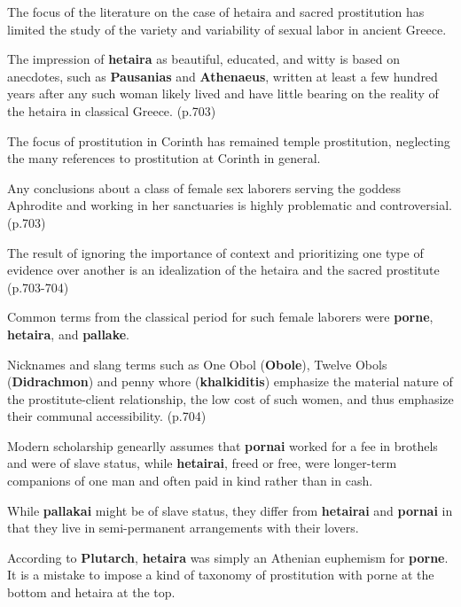 The focus of the literature on the case of hetaira and sacred prostitution has limited the study of the variety and variability of sexual labor in ancient Greece. 

\begin{rmk}
    The impression of \textbf{hetaira} as beautiful, educated, and witty is based on anecdotes, such as \textbf{Pausanias} and \textbf{Athenaeus}, written at least a few hundred years after any such woman likely lived and have little bearing on the reality of the hetaira in classical Greece. (p.703)
\end{rmk}

The focus of prostitution in Corinth has remained temple prostitution, neglecting the many references to prostitution at Corinth in general. 

\begin{nte}
    Any conclusions about a class of female sex laborers serving the goddess Aphrodite and working in her sanctuaries is highly problematic and controversial. (p.703)
\end{nte}

The result of ignoring the importance of context and prioritizing one type of evidence over another is an idealization of the hetaira and the sacred prostitute (p.703-704)

\begin{nte}
    Common terms from the classical period for such female laborers were \textbf{porne}, \textbf{hetaira}, and \textbf{pallake}.
\end{nte}

Nicknames and slang terms such as One Obol (\textbf{Obole}), Twelve Obols (\textbf{Didrachmon}) and penny whore (\textbf{khalkiditis}) emphasize the material nature of the prostitute-client relationship, the low cost of such women, and thus emphasize their communal accessibility. (p.704)

\begin{rmk}
    Modern scholarship genearlly assumes that \textbf{pornai} worked for a fee in brothels and were of slave status, while \textbf{hetairai}, freed or free, were longer-term companions of one man and often paid in kind rather than in cash.
\end{rmk}


While \textbf{pallakai} might be of slave status, they differ from \textbf{hetairai} and \textbf{pornai} in that they live in semi-permanent arrangements with their lovers.

According to \textbf{Plutarch}, \textbf{hetaira} was simply an Athenian euphemism for \textbf{porne}. It is a mistake to impose a kind of taxonomy of prostitution with porne at the bottom and hetaira at the top.


